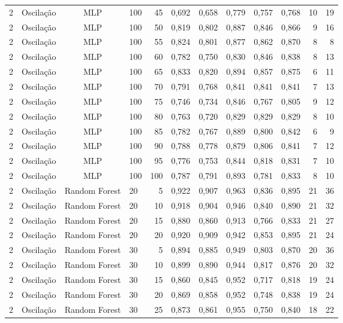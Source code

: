 \begin{longtable}{ccclrrrrrrrr}
2 & Oscilação & MLP & 100 & 45 & 0,692 & 0,658 & 0,779 & 0,757 & 0,768 & 10 & 19 \\
2 & Oscilação & MLP & 100 & 50 & 0,819 & 0,802 & 0,887 & 0,846 & 0,866 & 9 & 16 \\
2 & Oscilação & MLP & 100 & 55 & 0,824 & 0,801 & 0,877 & 0,862 & 0,870 & 8 & 8 \\
2 & Oscilação & MLP & 100 & 60 & 0,782 & 0,750 & 0,830 & 0,846 & 0,838 & 8 & 13 \\
2 & Oscilação & MLP & 100 & 65 & 0,833 & 0,820 & 0,894 & 0,857 & 0,875 & 6 & 11 \\
2 & Oscilação & MLP & 100 & 70 & 0,791 & 0,768 & 0,841 & 0,841 & 0,841 & 7 & 13 \\
2 & Oscilação & MLP & 100 & 75 & 0,746 & 0,734 & 0,846 & 0,767 & 0,805 & 9 & 12 \\
2 & Oscilação & MLP & 100 & 80 & 0,763 & 0,720 & 0,829 & 0,829 & 0,829 & 8 & 10 \\
2 & Oscilação & MLP & 100 & 85 & 0,782 & 0,767 & 0,889 & 0,800 & 0,842 & 6 & 9 \\
2 & Oscilação & MLP & 100 & 90 & 0,788 & 0,778 & 0,879 & 0,806 & 0,841 & 7 & 12 \\
2 & Oscilação & MLP & 100 & 95 & 0,776 & 0,753 & 0,844 & 0,818 & 0,831 & 7 & 10 \\
2 & Oscilação & MLP & 100 & 100 & 0,787 & 0,791 & 0,893 & 0,781 & 0,833 & 8 & 10 \\
2 & Oscilação & Random Forest & 20 & 5 & 0,922 & 0,907 & 0,963 & 0,836 & 0,895 & 21 & 36 \\
2 & Oscilação & Random Forest & 20 & 10 & 0,918 & 0,904 & 0,946 & 0,840 & 0,890 & 21 & 32 \\
2 & Oscilação & Random Forest & 20 & 15 & 0,880 & 0,860 & 0,913 & 0,766 & 0,833 & 21 & 27 \\
2 & Oscilação & Random Forest & 20 & 20 & 0,920 & 0,909 & 0,942 & 0,853 & 0,895 & 21 & 24 \\
2 & Oscilação & Random Forest & 30 & 5 & 0,894 & 0,885 & 0,949 & 0,803 & 0,870 & 20 & 36 \\
2 & Oscilação & Random Forest & 30 & 10 & 0,899 & 0,890 & 0,944 & 0,817 & 0,876 & 20 & 32 \\
2 & Oscilação & Random Forest & 30 & 15 & 0,860 & 0,845 & 0,952 & 0,717 & 0,818 & 19 & 24 \\
2 & Oscilação & Random Forest & 30 & 20 & 0,869 & 0,858 & 0,952 & 0,748 & 0,838 & 19 & 24 \\
2 & Oscilação & Random Forest & 30 & 25 & 0,873 & 0,861 & 0,955 & 0,750 & 0,840 & 18 & 22 \\

\end{longtable}
